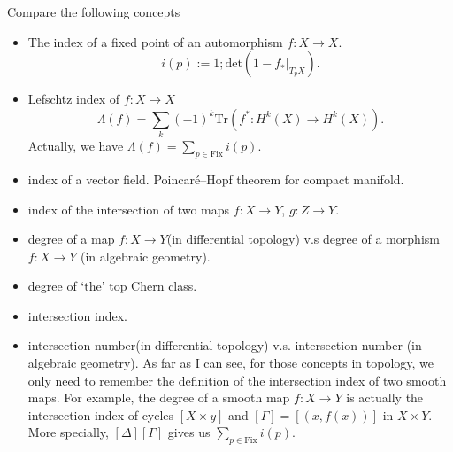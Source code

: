 \documentclass[main.tex]{subfiles}
\begin{document}
\begin{remark}
Compare the following concepts
\begin{itemize}
\item The index of a fixed point of an automorphism $f: X\rightarrow X$.
$$i(p):=1; \mathrm{det}(1-f_{*}|_{T_{p}X}).$$
\item Lefschtz index of $f: X\rightarrow X$ 
$$\Lambda(f)=\sum_{k}(-1)^{k}\mathrm{Tr}(f^{*}: H^{k}(X)\rightarrow H^{k}(X)).$$
Actually, we have $\Lambda(f)=\sum_{p\in \mathrm{Fix}}i(p).$
\item index of a vector field. Poincaré–Hopf theorem for compact manifold.
\item index of the intersection of two maps $f: X\rightarrow Y$, $g: Z\rightarrow Y.$
\item degree of a map $f: X\rightarrow Y$(in differential topology) v.s degree of a morphism $f: X\rightarrow Y$ (in algebraic geometry).
\item degree of `the' top Chern class.
\item intersection index.
\item intersection number(in differential topology) v.s. intersection number (in algebraic geometry).
As far as I can see, for those concepts in topology, we only need to remember the definition of the intersection index of two smooth maps. For example, the degree of a smooth map $f: X\rightarrow Y$ is actually the intersection index of cycles $[X\times y]$ and $[\Gamma]=[(x, f(x))]$ in $X\times Y.$ More specially, $[\Delta][\Gamma]$ gives us $\sum_{p\in \mathrm{Fix}}i(p).$
\end{itemize}
\end{remark}
\end{document}
